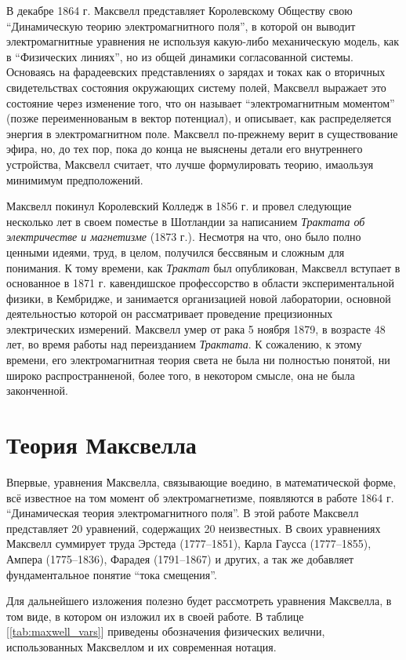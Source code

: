 \documentclass[12pt, oneside, a4paper]{article}
\begin{document}
В декабре 1864 г. Максвелл представляет Королевскому Обществу свою ``Динамическую теорию электромагнитного поля'', в которой он выводит электромагнитные уравнения не используя какую-либо механическую модель, как в ``Физических линиях'', но из общей динамики согласованной системы. Основаясь на фарадеевских представлениях о зарядах и токах как о вторичных свидетельствах состояния окружающих систему полей, Максвелл выражает это состояние через изменение того, что он называет ``электромагнитным моментом'' (позже переименнованым в вектор потенциал), и описывает, как распределяется энергия в электромагнитном поле. Максвелл по-прежнему верит в существование эфира, но, до тех пор, пока до конца не выяснены детали его внутреннего устройства, Максвелл считает, что лучше формулировать теорию, имаользуя минимимум предположений. 

Максвелл покинул Королевский Колледж в 1856 г. и провел следующие несколько лет в своем поместье в Шотландии за написанием  \emph{Трактата об электричестве и магнетизме} (1873 г.). Несмотря на что, оно было полно ценными идеями, труд, в целом, получился бессвяным и сложным для понимания. К тому времени, как \emph{Трактат} был опубликован, Максвелл вступает в основанное в 1871 г. кавендишское профессорство в области экспериментальной физики, в Кембридже, и занимается организацией новой лаборатории, основной деятельностью которой он рассматривает проведение прецизионных электрических измерений. Максвелл умер от рака 5 ноября 1879, в возрасте 48 лет, во время работы над переизданием \emph{Трактата}. К сожалению, к этому времени, его электромагнитная теория света не была ни полностью понятой, ни широко распространненой, более того, в некотором смысле, она не была законченной.
\section{Теория Максвелла}
Впервые, уравнения Максвелла, связывающие воедино, в математической форме, всё известное на том момент об электромагнетизме, появляются в работе 1864 г. ``Динамическая теория электромагнитного поля''. В этой работе Максвелл представляет 20 уравнений, содержащих 20 неизвестных.  В своих уравнениях Максвелл суммирует труда Эрстеда (1777--1851), Карла Гаусса (1777--1855), Ампера (1775--1836), Фарадея (1791--1867) и других, а так же добавляет фундаментальное понятие ``тока смещения''.

Для дальнейшего изложения полезно будет рассмотреть  уравнения Максвелла, в том виде, в котором он изложил их в своей работе. В таблице [\ref{tab:maxwell_vars}] приведены обозначения физических велични, использованных Максвеллом и их современная нотация. 
\end{document}
